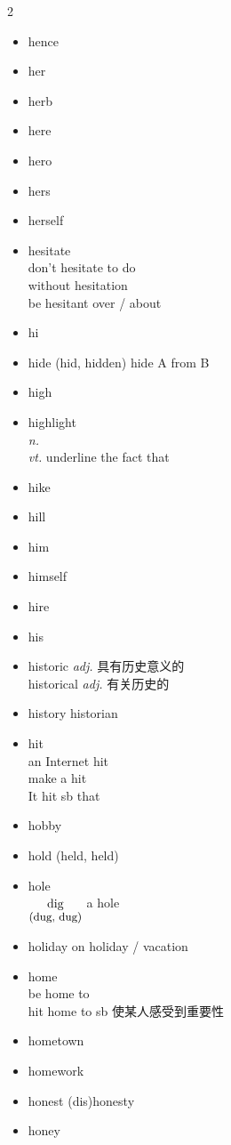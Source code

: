\documentclass[../../book.tex]{subfiles}
\begin{document}
\begin{multicols}{2}
\begin{itemize}
\item[-] hence
\item[-] her
\item[-] herb
\item[-] here
\item[-] hero
\item[-] hers
\item[-] herself
\item[-] hesitate
\\don\textquoteright t hesitate to do
\\without hesitation
\\be hesitant over / about
\item[-] hi
\item[-] hide (hid, hidden) \phantom{a} hide A from B
\item[-] high
\item[-] highlight
\\\emph{n.}
\\\emph{vt.} underline the fact that
\item[-] hike
\item[-] hill
\item[-] him
\item[-] himself
\item[-] hire
\item[-] his
\item[-] historic \emph{adj.} 具有历史意义的
\\historical \emph{adj.} 有关历史的
\item[-] history \phantom{a} historian
\item[-] hit
\\an Internet hit
\\make a hit
\\It hit sb that
\item[-] hobby
\item[-] hold (held, held)
\item[-] hole
\\$\underset{\text{\small (dug, dug)}}{\text{dig}}$ a hole
\item[-] holiday \phantom{a} on holiday / vacation
\item[-] home
\\be home to
\\hit home to sb 使某人感受到重要性
\item[-] hometown
\item[-] homework
\item[-] honest \phantom{a} (dis)honesty
\item[-] honey

\end{itemize}
\end{multicols}
\end{document}
